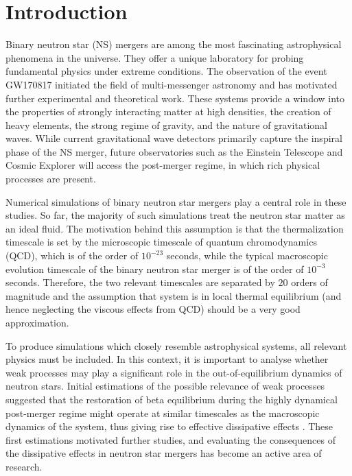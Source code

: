 \documentclass[prd,aps,twocolumn,floats,floatfix,nofootinbib,superscriptaddress] {revtex4-1}
\begin{document}
\maketitle

\tableofcontents



\section{Introduction}

Binary neutron star (NS) mergers are among the most fascinating astrophysical phenomena in the universe. They offer a unique laboratory for probing fundamental physics under extreme conditions. 
The observation of the event GW170817 \cite{Abbott:2017gw170817,Drout:2017ijr,Cowperthwaite:2017dyu} initiated the field of multi-messenger astronomy and has motivated further experimental and theoretical work. 
%
These systems provide a window into the properties of strongly interacting matter at high densities, the creation of heavy elements, the strong regime of gravity, and the nature of gravitational waves.
%
While current gravitational wave detectors primarily capture the inspiral phase of the NS merger, future observatories such as the Einstein Telescope \cite{Abac:2025saz} and Cosmic Explorer \cite{evans2021horizonstudycosmicexplorer} will access the post-merger regime, in which rich physical processes are present.


Numerical simulations of binary neutron star mergers play a central role in these studies. So far, the majority of such simulations treat the neutron star matter as an ideal fluid. The motivation behind this assumption is that the thermalization timescale  is set by the microscopic timescale of quantum chromodynamics (QCD), which is of the order of $10^{-23}$ seconds, while the typical macroscopic evolution timescale of the binary neutron star merger is of the order of $10^{-3}$ seconds.  Therefore, the two relevant timescales are separated by $20$ orders of magnitude and  the assumption that system is in local thermal equilibrium (and hence neglecting the viscous effects from QCD) should be a very good approximation.


To produce simulations which closely resemble astrophysical systems, all relevant physics must be included. In this context, it is important to analyse whether weak processes may play a significant role in the out-of-equilibrium dynamics of neutron stars.
Initial estimations of the possible relevance of weak processes suggested that the restoration of beta equilibrium during the highly dynamical post-merger regime might operate at similar timescales as the macroscopic dynamics of the system, 
thus giving rise to effective dissipative effects \cite{Alford:2017rxf}. 
%
These first estimations motivated further studies, and evaluating the consequences of the dissipative effects in neutron star mergers has become an active area of research. 
%
\end{document}
